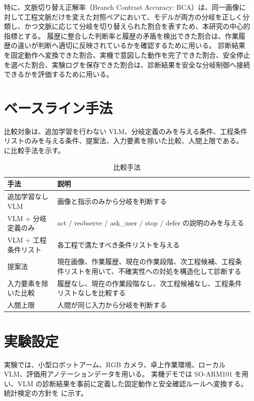 特に、文脈切り替え正解率（Branch Contrast Accuracy: BCA）は、同一画像に対して工程文脈だけを変えた対照ペアにおいて、モデルが両方の分岐を正しく分類し、かつ文脈に応じて分岐を切り替えられた割合を表すため、本研究の中心的指標とする。
履歴に整合した判断率と履歴の矛盾を検出できた割合は、作業履歴の違いが判断へ適切に反映されているかを確認するために用いる。
診断結果を固定動作へ変換できた割合、実機で意図した動作を完了できた割合、安全停止を選べた割合、実験ログを保存できた割合は、診断結果を安全な分岐制御へ接続できるかを評価するために用いる。

\section{ベースライン手法}

比較対象は、追加学習を行わない VLM、分岐定義のみを与える条件、工程条件リストのみを与える条件、提案法、入力要素を除いた比較、人間上限である。
 に比較手法を示す。

\begin{table}[tbp]
\centering
\caption{比較手法}
\label{tab:baseline}
\begin{tabularx}{\linewidth}{lX}
\toprule
手法 & 説明 \\
\midrule
追加学習なし VLM & 画像と指示のみから分岐を判断する \\
VLM + 分岐定義のみ & act / reobserve / ask\_user / stop / defer の説明のみを与える \\
VLM + 工程条件リスト & 各工程で満たすべき条件リストを与える \\
提案法 & 現在画像、作業履歴、現在の作業段階、次工程候補、工程条件リストを用いて、不確実性への対処を構造化して診断する \\
入力要素を除いた比較 & 履歴なし、現在の作業段階なし、次工程候補なし、工程条件リストなしを比較する \\
人間上限 & 人間が同じ入力から分岐を判断する \\
\bottomrule
\end{tabularx}
\end{table}

\section{実験設定}

実験では、小型ロボットアーム、RGB カメラ、卓上作業環境、ローカル VLM、評価用アノテーションデータを用いる。
実機デモでは SO-ARM101 を用い、VLM の診断結果を事前に定義した固定動作と安全確認ルールへ変換する。
統計検定の方針を  に示す。

